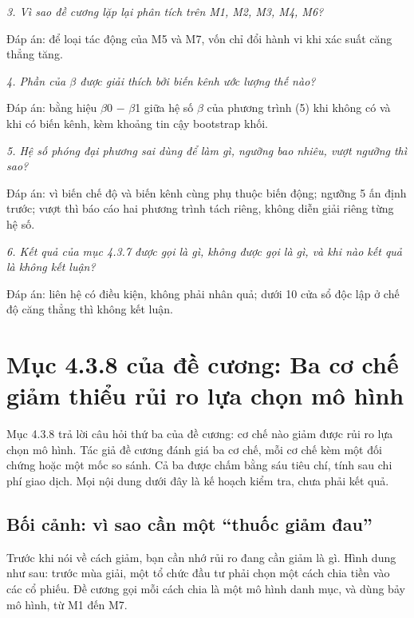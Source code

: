 {\itshape 3. Vì sao đề cương lặp lại phân tích trên M1, M2, M3, M4, M6?\par}

Đáp án: để loại tác động của M5 và M7, vốn chỉ đổi hành vi khi xác suất căng thẳng tăng.

{\itshape 4. Phần của \texorpdfstring{$\beta$}{beta} được giải thích bởi biến kênh ước lượng thế nào?\par}

Đáp án: bằng hiệu \texorpdfstring{$\beta$}{beta}0 − \texorpdfstring{$\beta$}{beta}1 giữa hệ số \texorpdfstring{$\beta$}{beta} của phương trình (5) khi không có và khi có biến kênh, kèm khoảng tin cậy bootstrap khối.

{\itshape 5. Hệ số phóng đại phương sai dùng để làm gì, ngưỡng bao nhiêu, vượt ngưỡng thì sao?\par}

Đáp án: vì biến chế độ và biến kênh cùng phụ thuộc biến động; ngưỡng 5 ấn định trước; vượt thì báo cáo hai phương trình tách riêng, không diễn giải riêng từng hệ số.

{\itshape 6. Kết quả của mục 4.3.7 được gọi là gì, không được gọi là gì, và khi nào kết quả là không kết luận?\par}

Đáp án: liên hệ có điều kiện, không phải nhân quả; dưới 10 cửa sổ độc lập ở chế độ căng thẳng thì không kết luận.

\chapter{Mục 4.3.8 của đề cương: Ba cơ chế giảm thiểu rủi ro lựa chọn mô hình}

Mục 4.3.8 trả lời câu hỏi thứ ba của đề cương: cơ chế nào giảm được rủi ro lựa chọn mô hình. Tác giả đề cương đánh giá ba cơ chế, mỗi cơ chế kèm một đối chứng hoặc một mốc so sánh. Cả ba được chấm bằng sáu tiêu chí, tính sau chi phí giao dịch. Mọi nội dung dưới đây là kế hoạch kiểm tra, chưa phải kết quả.

\section{Bối cảnh: vì sao cần một “thuốc giảm đau”}

Trước khi nói về cách giảm, bạn cần nhớ rủi ro đang cần giảm là gì. Hình dung như sau: trước mùa giải, một tổ chức đầu tư phải chọn một cách chia tiền vào các cổ phiếu. Đề cương gọi mỗi cách chia là một mô hình danh mục, và dùng bảy mô hình, từ M1 đến M7.

